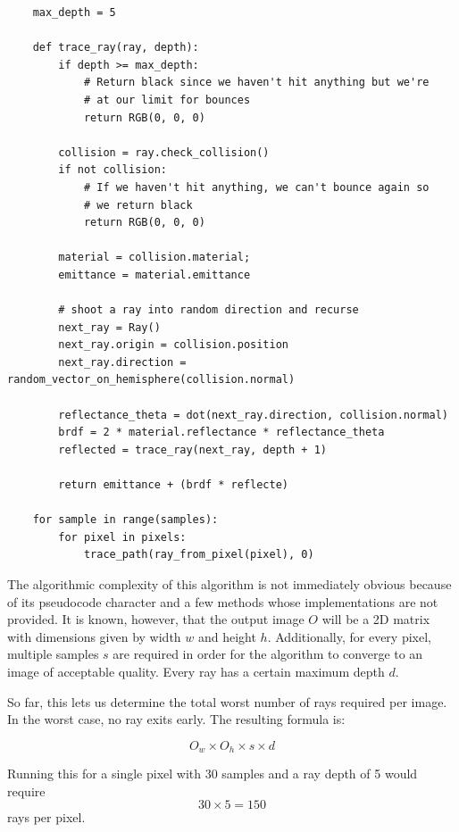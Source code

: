 \documentclass[
  twoside,
  11pt, a4paper,
  footinclude=true,
  headinclude=true,
  cleardoublepage=empty
]{scrreprt}
\begin{document}
\begin{verbatim}
    max_depth = 5

    def trace_ray(ray, depth):
        if depth >= max_depth:
            # Return black since we haven't hit anything but we're
            # at our limit for bounces
            return RGB(0, 0, 0) 

        collision = ray.check_collision()
        if not collision:
            # If we haven't hit anything, we can't bounce again so
            # we return black
            return RGB(0, 0, 0)

        material = collision.material;
        emittance = material.emittance

        # shoot a ray into random direction and recurse
        next_ray = Ray()
        next_ray.origin = collision.position
        next_ray.direction = random_vector_on_hemisphere(collision.normal)

        reflectance_theta = dot(next_ray.direction, collision.normal)
        brdf = 2 * material.reflectance * reflectance_theta
        reflected = trace_ray(next_ray, depth + 1)

        return emittance + (brdf * reflecte)

    for sample in range(samples):
        for pixel in pixels:
            trace_path(ray_from_pixel(pixel), 0)
\end{verbatim}

\vspace{1cm}

The algorithmic complexity of this algorithm is not immediately obvious because of its pseudocode
character and a few methods whose implementations are not provided. It is known, however, that
the output image \(O\) will be a 2D matrix with dimensions given by width \(w\) and height \(h\).
Additionally, for every pixel, multiple samples \(s\) are required in order for the algorithm to
converge to an image of acceptable quality. Every ray has a certain maximum depth \(d\).

So far, this lets us determine the total worst number of rays required per image. In the worst
case, no ray exits early. The resulting formula is:

\[ O_w \times O_h \times s \times d \]

Running this for a single pixel with 30 samples and a ray depth of 5 would require
\[30 \times 5 = \num{150}\]
rays per pixel.
\end{document}
